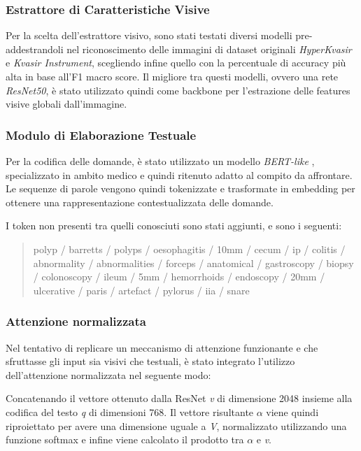 \documentclass[../main.tex]{subfiles}
\begin{document}
\subsubsection{Estrattore di Caratteristiche Visive}

Per la scelta dell'estrattore visivo, sono stati testati diversi modelli pre-addestrandoli nel riconoscimento delle immagini di dataset originali \textit{HyperKvasir} e \textit{Kvasir Instrument}, scegliendo infine quello con la percentuale di accuracy più alta in base all'F1 macro score.
Il migliore tra questi modelli, ovvero una rete \textit{ResNet50}, è stato utilizzato quindi come backbone per l'estrazione delle features visive globali dall'immagine.

\subsubsection{Modulo di Elaborazione Testuale}

Per la codifica delle domande, è stato utilizzato un modello \textit{BERT-like} \cite{alsentzer2019publiclyavailableclinicalbert}, specializzato in ambito medico e quindi ritenuto adatto al compito da affrontare. 
Le sequenze di parole vengono quindi tokenizzate e trasformate in embedding per ottenere una rappresentazione contestualizzata delle domande.

I token non presenti tra quelli conosciuti sono stati aggiunti, e sono i seguenti: 

\begin{quote}
    polyp / barretts / polyps / oesophagitis / 10mm / cecum / ip / colitis / abnormality / abnormalities / forceps / anatomical / gastroscopy / biopsy / colonoscopy / ileum / 5mm / hemorrhoids / endoscopy / 20mm / ulcerative / paris / artefact / pylorus / iia / snare
\end{quote} 

\subsubsection{Attenzione normalizzata}

Nel tentativo di replicare un meccanismo di attenzione funzionante e che sfruttasse gli input sia visivi che testuali, è stato integrato l'utilizzo dell'attenzione normalizzata nel seguente modo: 

Concatenando il vettore ottenuto dalla ResNet \textit{v} di dimensione 2048 insieme alla codifica del testo \textit{q} di dimensioni 768.
Il vettore risultante $\alpha$ viene quindi riproiettato per avere una dimensione uguale a \textit{V}, normalizzato utilizzando una funzione softmax e infine viene calcolato il prodotto tra $\alpha$ e \textit{v}.
\end{document}
